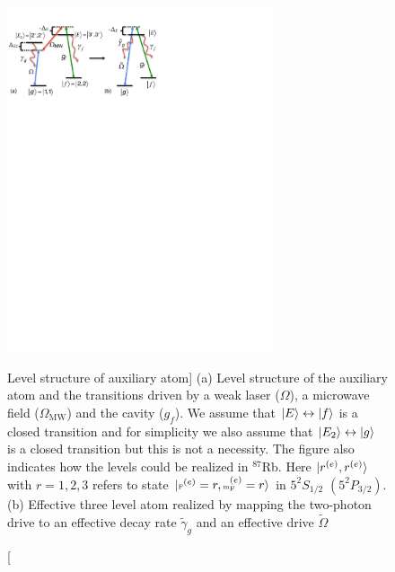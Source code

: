 \begin{figure}
\centering
\includegraphics[width=0.7\textwidth]{./figs_Borregaard_PRL2015/figureS2} 
\caption 
[Level structure of auxiliary atom]
{(a) Level structure of the auxiliary atom and the transitions driven by
a weak laser ($\Omega$), a microwave field ($\Omega_{\text{MW}}$) and the cavity
($g_{f}$). We assume that $| E \rangle\leftrightarrow| f \rangle$ is a closed transition
and for simplicity we also assume that $| E_{2} \rangle\leftrightarrow| g \rangle$ is a
closed transition but this is not a necessity. The figure also indicates how the
levels could be realized in ${}^{87}$Rb. Here $| r^{(e)},r^{(e)} \rangle$ with
$r=1,2,3$ refers to state $| \mbox{\tiny F}^{(e)}=r,\mbox{\tiny m}_{\mbox{\tiny F}}^{(e)}=r \rangle$
in $5^{2}S_{1/2}$ $(5^{2}P_{3/2})$. (b) Effective three level atom realized by
mapping the two-photon drive to an effective decay rate $\tilde{\gamma}_{g}$ and
an effective drive $\tilde{\Omega}$}
\label{fig:figureS2}
\end{figure} 

